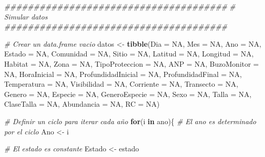 \documentclass[]{krantz}
\newenvironment{Shaded}{\begin{snugshade}}{\end{snugshade}}
\newcommand{\CommentTok}[1]{\textcolor[rgb]{0.56,0.35,0.01}{\textit{#1}}}
\newcommand{\ControlFlowTok}[1]{\textcolor[rgb]{0.13,0.29,0.53}{\textbf{#1}}}
\newcommand{\DataTypeTok}[1]{\textcolor[rgb]{0.13,0.29,0.53}{#1}}
\newcommand{\KeywordTok}[1]{\textcolor[rgb]{0.13,0.29,0.53}{\textbf{#1}}}
\newcommand{\NormalTok}[1]{#1}
\newcommand{\OtherTok}[1]{\textcolor[rgb]{0.56,0.35,0.01}{#1}}
\newcommand{\StringTok}[1]{\textcolor[rgb]{0.31,0.60,0.02}{#1}}
\begin{document}
\begin{Shaded}
\begin{Highlighting}[]
\CommentTok{######################################}
\CommentTok{# Simular datos}
\CommentTok{######################################}

\CommentTok{# Crear un data.frame vacio}
\NormalTok{datos <-}\StringTok{ }\KeywordTok{tibble}\NormalTok{(}\DataTypeTok{Dia =} \OtherTok{NA}\NormalTok{,}
                \DataTypeTok{Mes =} \OtherTok{NA}\NormalTok{,}
                \DataTypeTok{Ano =} \OtherTok{NA}\NormalTok{,}
                \DataTypeTok{Estado =} \OtherTok{NA}\NormalTok{,}
                \DataTypeTok{Comunidad =} \OtherTok{NA}\NormalTok{,}
                \DataTypeTok{Sitio =} \OtherTok{NA}\NormalTok{,}
                \DataTypeTok{Latitud =} \OtherTok{NA}\NormalTok{,}
                \DataTypeTok{Longitud =} \OtherTok{NA}\NormalTok{,}
                \DataTypeTok{Habitat =} \OtherTok{NA}\NormalTok{,}
                \DataTypeTok{Zona =} \OtherTok{NA}\NormalTok{,}
                \DataTypeTok{TipoProteccion =} \OtherTok{NA}\NormalTok{,}
                \DataTypeTok{ANP =} \OtherTok{NA}\NormalTok{,}
                \DataTypeTok{BuzoMonitor =} \OtherTok{NA}\NormalTok{,}
                \DataTypeTok{HoraInicial =} \OtherTok{NA}\NormalTok{,}
                \DataTypeTok{ProfundidadInicial =} \OtherTok{NA}\NormalTok{,}
                \DataTypeTok{ProfundidadFinal =} \OtherTok{NA}\NormalTok{,}
                \DataTypeTok{Temperatura =} \OtherTok{NA}\NormalTok{,}
                \DataTypeTok{Visibilidad =} \OtherTok{NA}\NormalTok{,}
                \DataTypeTok{Corriente =} \OtherTok{NA}\NormalTok{,}
                \DataTypeTok{Transecto =} \OtherTok{NA}\NormalTok{,}
                \DataTypeTok{Genero =} \OtherTok{NA}\NormalTok{,}
                \DataTypeTok{Especie =} \OtherTok{NA}\NormalTok{,}
                \DataTypeTok{GeneroEspecie =} \OtherTok{NA}\NormalTok{,}
                \DataTypeTok{Sexo =} \OtherTok{NA}\NormalTok{,}
                \DataTypeTok{Talla =} \OtherTok{NA}\NormalTok{,}
                \DataTypeTok{ClaseTalla =} \OtherTok{NA}\NormalTok{,}
                \DataTypeTok{Abundancia =} \OtherTok{NA}\NormalTok{,}
                \DataTypeTok{RC =} \OtherTok{NA}\NormalTok{)}

\CommentTok{# Definir un ciclo para iterar cada año}
\ControlFlowTok{for}\NormalTok{(i }\ControlFlowTok{in}\NormalTok{ ano)\{}
  \CommentTok{# El ano es determinado por el ciclo}
\NormalTok{  Ano <-}\StringTok{ }\NormalTok{i}
  
  \CommentTok{# El estado es constante}
\NormalTok{  Estado <-}\StringTok{ }\NormalTok{estado}
  

\end{Highlighting}
\end{Shaded}
\end{document}
